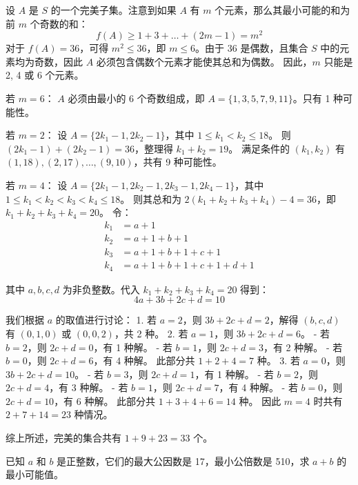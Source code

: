 \begin{questions}
\begin{solution}
设 $A$ 是 $S$ 的一个完美子集。注意到如果 $A$ 有 $m$ 个元素，那么其最小可能的和为前 $m$ 个奇数的和：
\[
f(A) \ge 1 + 3 + \dots + (2m - 1) = m^2
\]
对于 $f(A) = 36$，可得 $m^2 \le 36$，即 $m \le 6$。由于 36 是偶数，且集合 $S$ 中的元素均为奇数，因此 $A$ 必须包含偶数个元素才能使其总和为偶数。
因此，$m$ 只能是 2, 4 或 6 个元素。

 若 $m = 6$：
    $A$ 必须由最小的 6 个奇数组成，即 $A = \{1, 3, 5, 7, 9, 11\}$。只有 1 种可能性。

 若 $m = 2$：
    设 $A = \{2k_1 - 1, 2k_2 - 1\}$，其中 $1 \le k_1 < k_2 \le 18$。
    则 $(2k_1 - 1) + (2k_2 - 1) = 36$，整理得 $k_1 + k_2 = 19$。
    满足条件的 $(k_1, k_2)$ 有 $(1, 18), (2, 17), \dots, (9, 10)$，共有 9 种可能性。

 若 $m = 4$：
    设 $A = \{2k_1 - 1, 2k_2 - 1, 2k_3 - 1, 2k_4 - 1\}$，其中 $1 \le k_1 < k_2 < k_3 < k_4 \le 18$。
    则其总和为 $2(k_1 + k_2 + k_3 + k_4) - 4 = 36$，即 $k_1 + k_2 + k_3 + k_4 = 20$。
    令：
    \begin{align}
    k_1 &= a + 1 \\
    k_2 &= a + 1 + b + 1 \\
    k_3 &= a + 1 + b + 1 + c + 1 \\
    k_4 &= a + 1 + b + 1 + c + 1 + d + 1
    \end{align}
   
    其中 $a, b, c, d$ 为非负整数。代入 $k_1 + k_2 + k_3 + k_4 = 20$ 得到：
    \[
    4a + 3b + 2c + d = 10
    \]
   
    我们根据 $a$ 的取值进行讨论：
    1.  若 $a = 2$，则 $3b + 2c + d = 2$，解得 $(b, c, d)$ 有 $(0, 1, 0)$ 或 $(0, 0, 2)$，共 2 种。
    2.  若 $a = 1$，则 $3b + 2c + d = 6$。
        - 若 $b = 2$，则 $2c + d = 0$，有 1 种解。
        - 若 $b = 1$，则 $2c + d = 3$，有 2 种解。
        - 若 $b = 0$，则 $2c + d = 6$，有 4 种解。
        此部分共 $1 + 2 + 4 = 7$ 种。
    3.  若 $a = 0$，则 $3b + 2c + d = 10$。
        - 若 $b = 3$，则 $2c + d = 1$，有 1 种解。
        - 若 $b = 2$，则 $2c + d = 4$，有 3 种解。
        - 若 $b = 1$，则 $2c + d = 7$，有 4 种解。
        - 若 $b = 0$，则 $2c + d = 10$，有 6 种解。
        此部分共 $1 + 3 + 4 + 6 = 14$ 种。
    因此 $m = 4$ 时共有 $2 + 7 + 14 = 23$ 种情况。

综上所述，完美的集合共有 $1 + 9 + 23 = 33$ 个。
\end{solution}

\question 已知 $a$ 和 $b$ 是正整数，它们的最大公因数是 17，最小公倍数是 510，求 $a + b$ 的最小可能值。


\end{questions}
